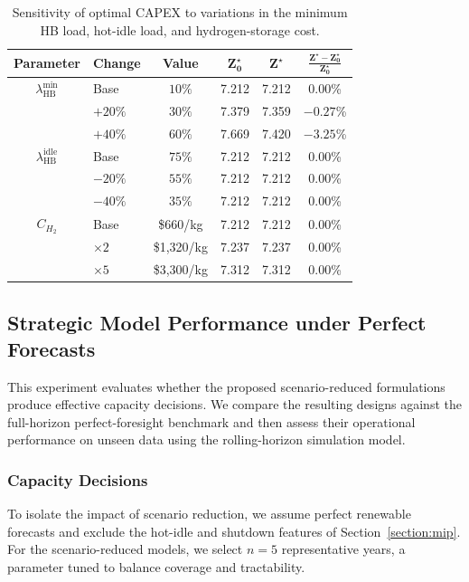 \documentclass[11pt, letter]{article}
\begin{document}
\begin{table}[tbp]
\centering
\caption{Sensitivity of optimal CAPEX to variations in the minimum HB load, hot-idle load, and hydrogen-storage cost.}
\label{tab:robustness_results}
\renewcommand{\arraystretch}{1.15}
\begin{tabular}{c l c c c c}
\toprule
\textbf{Parameter}
& \textbf{Change}
& \textbf{Value}
& $\boldsymbol{Z_0^\star}$
& $\boldsymbol{Z^\star}$
& $\boldsymbol{\frac{Z^\star-Z_0^\star}{Z_0^\star}}$ \\
\midrule
$\lambda_{\mathrm{HB}}^{\min}$
& Base       & $10\%$  & 7.212 & 7.212 & 0.00\% \\
& $+20\%$    & $30\%$  & 7.379 & 7.359 & $-0.27$\% \\
& $+40\%$    & $60\%$  & 7.669 & 7.420 & $-3.25$\% \\
\midrule
$\lambda_{\mathrm{HB}}^{\mathrm{idle}}$
& Base       & $75\%$  & 7.212 & 7.212 & 0.00\% \\
& $-20\%$    & $55\%$  & 7.212 & 7.212 & 0.00\% \\
& $-40\%$    & $35\%$  & 7.212 & 7.212 & 0.00\% \\
\midrule
$C_{H_2}$
& Base       & \$660/kg     & 7.212 & 7.212 & 0.00\% \\
& $\times 2$ & \$1{,}320/kg & 7.237 & 7.237 & 0.00\% \\
& $\times 5$ & \$3{,}300/kg & 7.312 & 7.312 & 0.00\% \\
\bottomrule
\end{tabular}
\end{table}\subsection{Strategic Model Performance under Perfect Forecasts}

This experiment evaluates whether the proposed scenario-reduced formulations produce effective capacity decisions. We compare the resulting designs against the full-horizon perfect-foresight benchmark and then assess their operational performance on unseen data using the rolling-horizon simulation model.

\subsubsection{Capacity Decisions}

To isolate the impact of scenario reduction, we assume perfect renewable forecasts and exclude the hot-idle and shutdown features of Section~\ref{section:mip}. For the scenario-reduced models, we select $n=5$ representative years, a parameter tuned to balance coverage and tractability.
\end{document}
